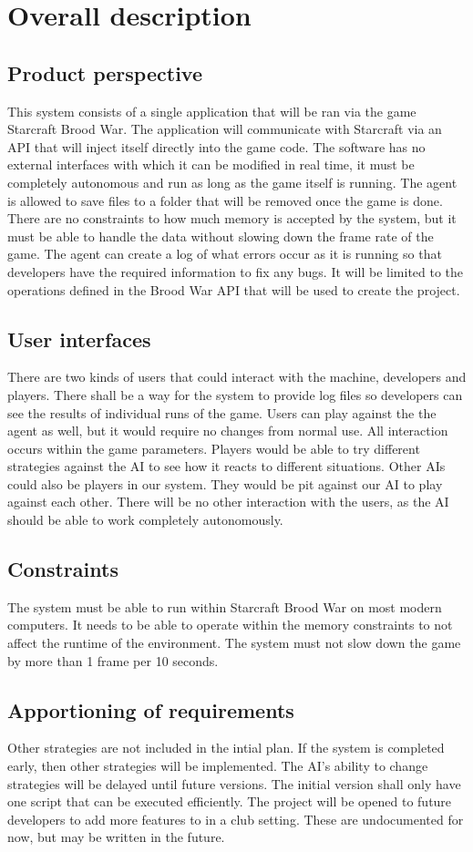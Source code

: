 \section{Overall description}

\subsection{Product perspective}
This system consists of a single application that will be ran via the game Starcraft Brood War.
The application will communicate with Starcraft via an API that will inject itself directly into the game code.
The software has no external interfaces with which it can be modified in real time, it must be completely autonomous and run as long as the game itself is running.
The agent is allowed to save files to a folder that will be removed once the game is done. There are no constraints to how much memory is accepted by the system,
but it must be able to handle the data without slowing down the frame rate of the game.
The agent can create a log of what errors occur as it is running so that developers have the required information to fix any bugs.
It will be limited to the operations defined in the Brood War API that will be used to create the project.

\subsection{User interfaces}
There are two kinds of users that could interact with the machine, developers and players.
There shall be a way for the system to provide log files so developers can see the results of individual runs of the game.
Users can play against the the agent as well, but it would require no changes from normal use. All interaction occurs within the game parameters.
Players would be able to try different strategies against the AI to see how it reacts to different situations.
Other AIs could also be players in our system. They would be pit against our AI to play against each other.
There will be no other interaction with the users, as the AI should be able to work completely autonomously.

\subsection{Constraints}
The system must be able to run within Starcraft Brood War on most modern computers. It needs to be able to operate within the memory constraints to not affect the runtime of the environment.
The system must not slow down the game by more than 1 frame per 10 seconds. 

\subsection{Apportioning of requirements}
Other strategies are not included in the intial plan. If the system is completed early, then other strategies will be implemented.
The AI's ability to change strategies will be delayed until future versions. The initial version shall only have one script that can be executed efficiently.
The project will be opened to future developers to add more features to in a club setting. These are undocumented for now, but may be written in the future.
